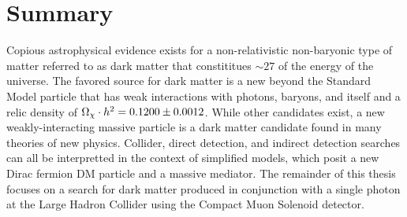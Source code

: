 \section{Summary}
Copious astrophysical evidence exists for a non-relativistic non-baryonic type of matter referred to as dark matter that constititues $\sim27$ of the energy of the universe.
The favored source for dark matter is a new beyond the Standard Model particle that has weak interactions with photons, baryons, and itself and a relic density of $\Omega_\chi \cdot h^2 = 0.1200 \pm 0.0012$.
While other candidates exist, a new weakly-interacting massive particle is a dark matter candidate found in many theories of new physics.
Collider, direct detection, and indirect detection searches can all be interpretted in the context of simplified models, which posit a new Dirac fermion DM particle and a massive mediator.
The remainder of this thesis focuses on a search for dark matter produced in conjunction with a single photon at the Large Hadron Collider using the Compact Muon Solenoid detector.
